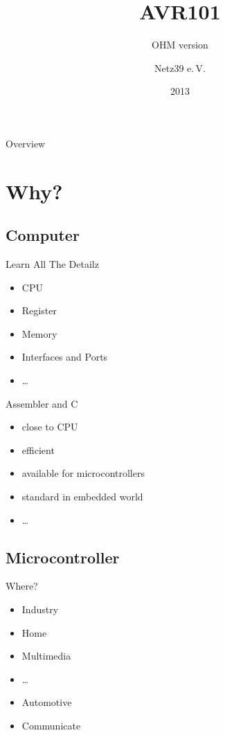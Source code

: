 \documentclass{beamer}
\title{AVR101}
\subtitle{OHM version}
\author{Netz39 e.\,V.}
\institute{\url{http://www.netz39.de/}}
\date{2013}
\begin{document}
\begin{frame}
	\titlepage
\end{frame}

\begin{frame}{Overview}
    \tableofcontents
\end{frame}

\section{Why?}

\subsection{Computer}

\begin{frame}{Learn All The Detailz}
    \begin{itemize}
        \item CPU
        \item Register
        \item Memory
        \item Interfaces and Ports
        \item \dots
    \end{itemize}
\end{frame}

\begin{frame}{Assembler and C}
    \begin{itemize}
        \item close to CPU
        \item efficient
        \item available for microcontrollers
        \item standard in embedded world
        \item \dots
    \end{itemize}
\end{frame}

\subsection{Microcontroller}

\begin{frame}{Where?}
    \begin{itemize}
        \item Industry
        \item Home
        \item Multimedia
        \item \dots
        \pause
        \item Automotive
        \item Communicate
    \end{itemize}
\end{frame}
\end{document}
